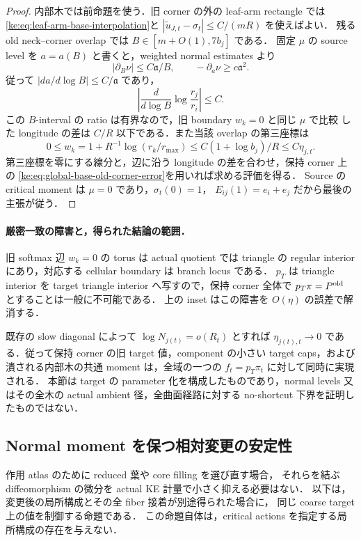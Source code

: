 \begin{proof}
内部木では前命題を使う．旧 corner の外の leaf-arm rectangle では
\eqref{ke:eq:leaf-arm-base-interpolation}と
$|\widetilde u_{J,t}-\sigma_t|\le C/(mR)$ を使えばよい．
残る old neck--corner overlap では $B\in[m+O(1),7b_j]$ である．
固定 $\mu$ の source level を $a=a(B)$ と書くと，weighted normal estimates より
\[
 |\partial_B\nu|\le C\mathfrak a/B,
 \qquad -\partial_a\nu\ge c\mathfrak a^2.
\]
従って $|da/d\log B|\le C/\mathfrak a$ であり，
\[
 \left|\frac{d}{d\log B}\log\frac{r_j}{r_i}\right|\le C.
\]
この $B$-interval の ratio は有界なので，旧 boundary $w_k=0$ と同じ $\mu$ で比較
した longitude の差は $C/R$ 以下である．また当該 overlap の第三座標は
\[
 0\le w_k=1+R^{-1}\log(r_k/r_{\max})
 \le C(1+\log b_j)/R\le C\eta_{j,t}.
\]
第三座標を零にする線分と，辺に沿う longitude の差を合わせ，保持 corner 上の
\eqref{ke:eq:global-base-old-corner-error}を用いれば求める評価を得る．
Source の critical moment は $\mu=0$ であり，$\sigma_t(0)=1$，
$E_{ij}(1)=e_i+e_j$ だから最後の主張が従う．
\end{proof}

\paragraph{厳密一致の障害と，得られた結論の範囲．}
旧 softmax 辺 $w_k=0$ の torus は actual quotient では triangle の regular
interior にあり，対応する cellular boundary は branch locus である．
$p_T$ は triangle interior を target triangle interior へ写すので，保持 corner
全体で $p_T\pi=P^{\rm old}$ とすることは一般に不可能である．
上の inset はこの障害を $O(\eta)$ の誤差で解消する．

既存の slow diagonal によって $\log N_{j(t)}=o(R_t)$ とすれば
$\eta_{j(t),t}\to0$ である．従って保持 corner の旧 target 値，component の小さい
target caps，および潰される内部木の共通 moment は，全域の一つの
$f_t=p_T\pi_t$ に対して同時に実現される．
本節は target の parameter 化を構成したものであり，normal levels 又はその全木の
actual ambient 径，全曲面経路に対する no-shortcut 下界を証明したものではない．

\subsection{Normal moment を保つ相対変更の安定性}
\label{ke:relative-replacement-section}

作用 atlas のために reduced 葉や core filling を選び直す場合，
それらを結ぶ diffeomorphism の微分を actual KE 計量で小さく抑える必要はない．
以下は，変更後の局所構成とその全 fiber 接着が別途得られた場合に，
同じ coarse target 上の値を制御する命題である．
この命題自体は，critical actions を指定する局所構成の存在を与えない．

